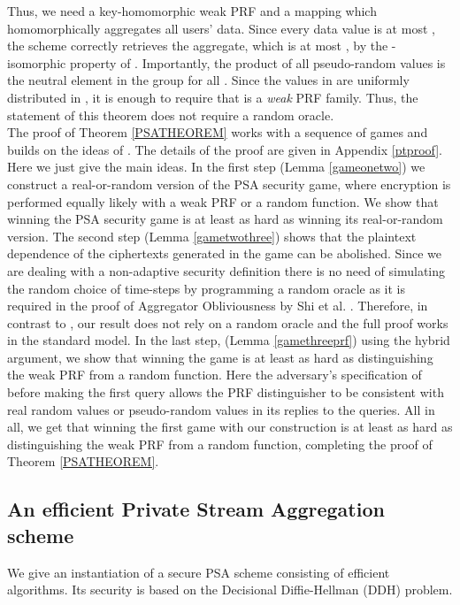 \documentclass[10pt]{extarticle}
\begin{document}
Thus, we need a key-homomorphic weak PRF and a mapping which homomorphically aggregates all users' data. Since every data value is at most , the scheme correctly retrieves the aggregate, which is at most , by the -isomorphic property of . Importantly, the product of all pseudo-random values  is the neutral element in the group  for all . Since the values in  are uniformly distributed in , it is enough to require that  is a \textit{weak} PRF family. Thus, the statement of this theorem does not require a random oracle.\\
The proof of Theorem \ref{PSATHEOREM} works with a sequence of games and builds on the ideas of \cite{2}. The details of the proof are given in Appendix \ref{ptproof}. 
Here we just give the main ideas. In the first step (Lemma \ref{gameonetwo}) 
we construct a real-or-random version of the PSA security game, where encryption is performed equally likely with a weak PRF or a random function. We show that winning the PSA security game is at least as hard as winning its real-or-random version. The second step (Lemma \ref{gametwothree}) 
shows that the plaintext dependence of the ciphertexts generated in the game can be abolished. Since we are dealing with a non-adaptive security definition there is no need of simulating the random choice of time-steps by programming a random oracle as it is required in the proof of Aggregator Obliviousness by Shi et al. \cite{2}. Therefore, in contrast to \cite{2}, our result does not rely on a random oracle and the full proof works in the standard model. In the last step, (Lemma \ref{gamethreeprf})
using the hybrid argument, we show that winning the game is at least as hard as distinguishing the weak PRF from a random function. Here the adversary's specification of  before making the first query allows the PRF distinguisher to be consistent with real random values or pseudo-random values in its replies to the queries. All in all, we get that winning the first game with our construction is at least as hard as distinguishing the weak PRF from a random function, completing the proof of Theorem \ref{PSATHEOREM}.

\subsection{An efficient Private Stream Aggregation scheme}

We give an instantiation of a secure PSA scheme consisting of efficient algorithms. Its security is based on the Decisional Diffie-Hellman (DDH) problem.
\end{document}

